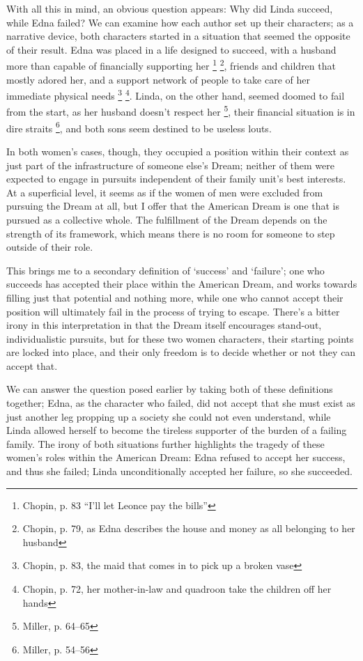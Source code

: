 With all this in mind, an obvious question appears: Why did Linda succeed,
while Edna failed?  We can examine how each author set up their characters; as
a narrative device, both characters started in a situation that seemed the
opposite of their result.  Edna was placed in a life designed to succeed, with
a husband more than capable of financially supporting her \footnote{Chopin,
p. 83 ``I'll let Leonce pay the bills''} \footnote{Chopin, p. 79, as Edna
describes the house and money as all belonging to her husband}, friends and
children that mostly adored her, and a support network of people to take care
of her immediate physical needs \footnote{Chopin, p. 83, the maid that comes
in to pick up a broken vase} \footnote{Chopin, p. 72, her mother-in-law and
quadroon take the children off her hands}. Linda, on the other hand, seemed
doomed to fail from the start, as her husband doesn't respect her
\footnote{Miller, p. 64--65}, their financial situation is in dire straits
\footnote{Miller, p. 54--56}, and both sons seem destined to be useless louts.

In both women's cases, though, they occupied a position within their context
as just part of the infrastructure of someone else's Dream; neither of them
were expected to engage in pursuits independent of their family unit's
best interests. At a superficial level, it seems as if the women of men were
excluded from pursuing the Dream at all, but I offer that the American Dream
is one that is pursued as a collective whole. The fulfillment of the Dream
depends on the strength of its framework, which means there is no room for
someone to step outside of their role.

This brings me to a secondary definition of `success' and `failure'; one who
succeeds has accepted their place within the American Dream, and works towards
filling just that potential and nothing more, while one who cannot accept
their position will ultimately fail in the process of trying to escape.
There's a bitter irony in this interpretation in that the Dream itself
encourages stand-out, individualistic pursuits, but for these two women
characters, their starting points are locked into place, and their only
freedom is to decide whether or not they can accept that.

We can answer the question posed earlier by taking both of these definitions
together; Edna, as the character who failed, did not accept that she must
exist as just another leg propping up a
society she could not even understand, while Linda allowed herself to become
the tireless supporter of the burden of a failing family. The irony of both
situations further highlights the tragedy of these women's roles within the
American Dream: Edna refused to accept her success, and thus she
failed; Linda unconditionally accepted her failure, so she succeeded.

